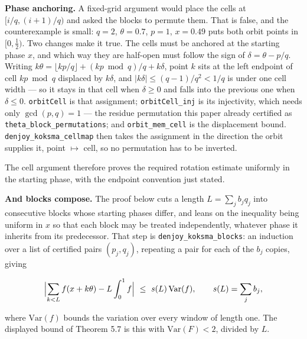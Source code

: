 \documentclass[12pt]{article}
\begin{document}
\textbf{Phase anchoring.} A fixed-grid argument would place the cells at
\([i/q,(i+1)/q)\) and asked the blocks to permute them. That is false,
and the counterexample is small: \(q=2\), \(\theta=0.7\), \(p=1\),
\(x=0.49\) puts both orbit points in \([0,\tfrac12)\). Two changes make
it true. The cells must be anchored at the starting phase \(x\), and
which way they are half-open must follow the sign of
\(\delta=\theta-p/q\). Writing
\(k\theta=\lfloor kp/q\rfloor+(kp\bmod q)/q+k\delta\), point \(k\) sits
at the left endpoint of cell \(kp\bmod q\) displaced by \(k\delta\), and
\(|k\delta|\le (q-1)/q^{2}<1/q\) is under one cell width --- so it stays
in that cell when \(\delta\ge0\) and falls into the previous one when
\(\delta\le0\). \texttt{\nolinkurl{orbitCell}} is that assignment;
\texttt{\nolinkurl{orbitCell_inj}} is its injectivity, which needs only
\(\gcd(p,q)=1\) --- the residue permutation this paper already certified
as \texttt{\nolinkurl{theta_block_permutations}}; and
\texttt{\nolinkurl{orbit_mem_cell}} is the displacement bound.
\texttt{\nolinkurl{denjoy_koksma_cellmap}} then takes the assignment in
the direction the orbit supplies it, point \(\mapsto\) cell, so no
permutation has to be inverted.

The cell argument therefore proves the required rotation estimate
uniformly in the starting phase, with the endpoint convention just
stated.

\textbf{And blocks compose.} The proof below cuts a length
\(L=\sum_jb_jq_j\) into consecutive blocks whose starting phases differ,
and leans on the inequality being uniform in \(x\) so that each block
may be treated independently, whatever phase it inherits from its
predecessor. That step is \texttt{\nolinkurl{denjoy_koksma_blocks}}: an
induction over a list of certified pairs \((p_j,q_j)\), repeating a pair
for each of the \(b_j\) copies, giving

\[
\Bigl|\sum_{k<L}f(x+k\theta)-L\int_0^1f\Bigr|\ \le\ s(L)\,\mathrm{Var}(f),
\qquad s(L)=\sum_jb_j,
\]

where \(\mathrm{Var}(f)\) bounds the variation over every window of
length one. The displayed bound of Theorem 5.7 is this with
\(\mathrm{Var}(F)<2\), divided by \(L\).
\end{document}
